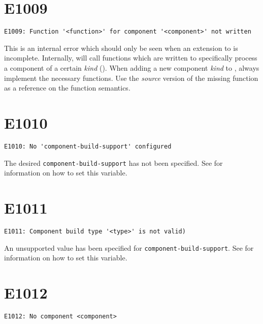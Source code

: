 \section{E1009}

\begin{footnotesize}
\begin{verbatim}
E1009: Function '<function>' for component '<component>' not written
\end{verbatim}
\end{footnotesize}

This is an internal error which should only be seen when an extension
to \lmsbw is incomplete.  Internally, \lmsbw will call functions which
are written to specifically process a component of a certain
\emph{kind} ().  When adding a new component
\emph{kind} to \lmsbw, always implement the necessary functions.  Use
the \emph{source} version of the missing function as a reference on
the function semantics.

\section{E1010}
\begin{footnotesize}
\begin{verbatim}
E1010: No 'component-build-support' configured
\end{verbatim}
\end{footnotesize}

The desired \texttt{component-build-support} has not been specified.
See  for information on how to
set this variable.

\section{E1011}
\begin{footnotesize}
\begin{verbatim}
E1011: Component build type '<type>' is not valid)
\end{verbatim}
\end{footnotesize}

An unsupported value has been specified for
\texttt{component-build-support}.  See
 for information on how to set
this variable.

\section{E1012}
\begin{footnotesize}
\begin{verbatim}
E1012: No component <component>
\end{verbatim}
\end{footnotesize}

